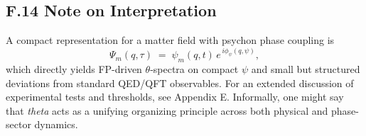 \subsection*{F.14 Note on Interpretation}
A compact representation for a matter field with psychon phase coupling is
\begin{equation}
\Psi_m(q,\tau) \;=\; \psi_m(q,t)\, e^{\,i\phi_\psi(q,\psi)},
\end{equation}
which directly yields FP-driven $\theta$-spectra on compact $\psi$ and small but structured deviations from standard QED/QFT observables. For an extended discussion of experimental tests and thresholds, see Appendix E. Informally, one might say that \emph{theta} acts as a unifying organizing principle across both physical and phase-sector dynamics.

